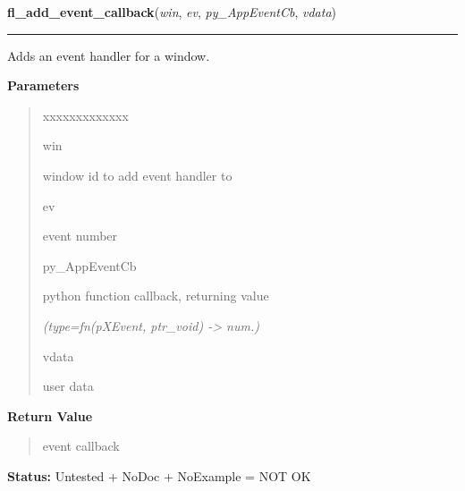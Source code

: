 \hspace{.8\funcindent}\begin{boxedminipage}{\funcwidth}

    \raggedright \textbf{fl\_add\_event\_callback}(\textit{win}, \textit{ev}, \textit{py\_AppEventCb}, \textit{vdata})

    \vspace{-1.5ex}

    \rule{\textwidth}{0.5\fboxrule}
\setlength{\parskip}{2ex}
    Adds an event handler for a window.

\setlength{\parskip}{1ex}
      \textbf{Parameters}
      \vspace{-1ex}

      \begin{quote}
        \begin{Ventry}{xxxxxxxxxxxxx}

          \item[win]

          window id to add event handler to

          \item[ev]

          event number

          \item[py\_AppEventCb]

          python function callback, returning value

            {\it (type=fn(pXEvent, ptr\_void) -{\textgreater} num.)}

          \item[vdata]

          user data

        \end{Ventry}

      \end{quote}

      \textbf{Return Value}
    \vspace{-1ex}

      \begin{quote}
      event callback

      \end{quote}

\textbf{Status:} Untested + NoDoc + NoExample = NOT OK



    \end{boxedminipage}

    \label{xformslib:library:fl_remove_event_callback}

